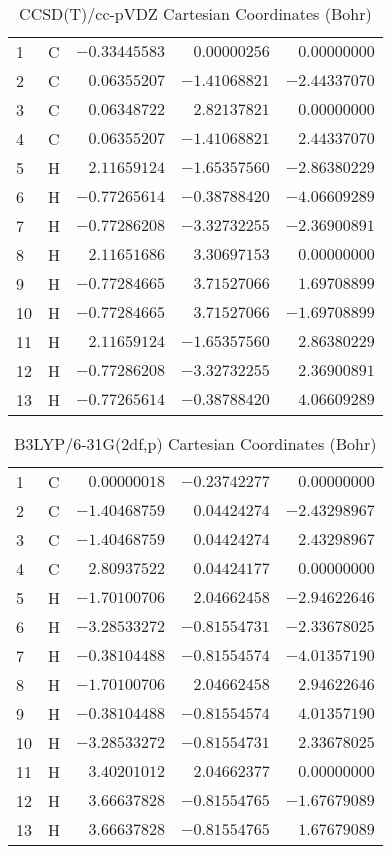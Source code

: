 \documentclass[10pt,oneside]{article}
\begin{document}
\begin{table}[h!]
\centering
\caption{CCSD(T)/cc-pVDZ Cartesian Coordinates (Bohr)}
\begin{tabular}{llrrr}
1  & C  & $-0.33445583$ & $ 0.00000256$ & $ 0.00000000$ \\
2  & C  & $ 0.06355207$ & $-1.41068821$ & $-2.44337070$ \\
3  & C  & $ 0.06348722$ & $ 2.82137821$ & $ 0.00000000$ \\
4  & C  & $ 0.06355207$ & $-1.41068821$ & $ 2.44337070$ \\
5  & H  & $ 2.11659124$ & $-1.65357560$ & $-2.86380229$ \\
6  & H  & $-0.77265614$ & $-0.38788420$ & $-4.06609289$ \\
7  & H  & $-0.77286208$ & $-3.32732255$ & $-2.36900891$ \\
8  & H  & $ 2.11651686$ & $ 3.30697153$ & $ 0.00000000$ \\
9  & H  & $-0.77284665$ & $ 3.71527066$ & $ 1.69708899$ \\
10 & H  & $-0.77284665$ & $ 3.71527066$ & $-1.69708899$ \\
11 & H  & $ 2.11659124$ & $-1.65357560$ & $ 2.86380229$ \\
12 & H  & $-0.77286208$ & $-3.32732255$ & $ 2.36900891$ \\
13 & H  & $-0.77265614$ & $-0.38788420$ & $ 4.06609289$ \\
\end{tabular}
\end{table}

\begin{table}[h!]
\centering
\caption{B3LYP/6-31G(2df,p) Cartesian Coordinates (Bohr)}
\begin{tabular}{llrrr}
1  & C  & $ 0.00000018$ & $-0.23742277$ & $ 0.00000000$ \\
2  & C  & $-1.40468759$ & $ 0.04424274$ & $-2.43298967$ \\
3  & C  & $-1.40468759$ & $ 0.04424274$ & $ 2.43298967$ \\
4  & C  & $ 2.80937522$ & $ 0.04424177$ & $ 0.00000000$ \\
5  & H  & $-1.70100706$ & $ 2.04662458$ & $-2.94622646$ \\
6  & H  & $-3.28533272$ & $-0.81554731$ & $-2.33678025$ \\
7  & H  & $-0.38104488$ & $-0.81554574$ & $-4.01357190$ \\
8  & H  & $-1.70100706$ & $ 2.04662458$ & $ 2.94622646$ \\
9  & H  & $-0.38104488$ & $-0.81554574$ & $ 4.01357190$ \\
10 & H  & $-3.28533272$ & $-0.81554731$ & $ 2.33678025$ \\
11 & H  & $ 3.40201012$ & $ 2.04662377$ & $ 0.00000000$ \\
12 & H  & $ 3.66637828$ & $-0.81554765$ & $-1.67679089$ \\
13 & H  & $ 3.66637828$ & $-0.81554765$ & $ 1.67679089$ \\
\end{tabular}
\end{table}
\end{document}
